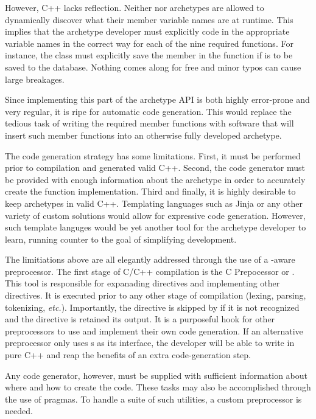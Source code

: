 However, C++ lacks reflection. Neither  nor archetypes are allowed
to dynamically discover what their member variable names are at runtime.  This 
implies that the archetype developer must explicitly code in the appropriate variable
names in the correct way for each of the nine required functions.  For instance, 
the  class must explicitly save the  member in the 
 function if  is to be saved to the database.
Nothing comes along for free and minor typos can cause large breakages. 

Since implementing this part of the archetype \gls{API} is both highly error-prone and 
very regular, it is ripe for automatic code generation. This would replace the 
tedious task of writing the required member functions with software that will 
insert such member functions into an otherwise fully developed archetype. 

The code generation strategy has some limitations. First, it must be 
performed prior to compilation and generated valid C++. Second, the
code generator must be provided with enough information about the archetype in 
order to accurately create the function implementation. Third and finally, it 
is highly desirable to keep archetypes in valid C++. Templating languages 
such as Jinja \citeme or any other variety of custom solutions would allow for 
expressive code generation. However, such template languges would be yet another 
tool for the archetype developer to learn, running counter to the goal of 
simplifying development.

The limitiations above are all elegantly addressed through the use of a 
\cyclus-aware preprocessor. The first stage of C/C++ compilation is the 
C Prepocessor or  \citeme. This tool is responsible for expanading 
 directives and implementing other \code{#} directives. It is executed
prior to any other stage of compilation (lexing, parsing, tokenizing, \emph{etc.}).
Importantly, the  directive is skipped by  if it is not 
recognized and the directive is retained its output. It is a
purposeful hook for other preprocessors to use and implement their own code generation.
If an alternative preprocessor only uses s as its interface, 
the developer will be able to write in pure C++ and reap the benefits
of an extra code-generation step. 

Any code generator, however, must be supplied with sufficient information about
where and how to create the code. These tasks may also be accomplished through 
the use of pragmas. To handle a suite of such utilities, a custom preprocessor
is needed.

